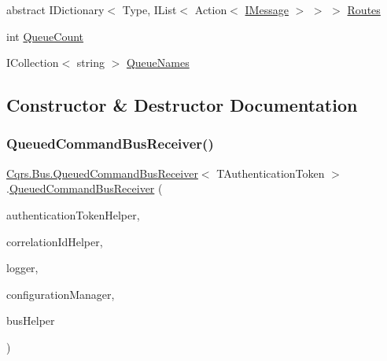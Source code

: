 \begin{DoxyCompactItemize}
\item 
abstract I\+Dictionary$<$ Type, I\+List$<$ Action$<$ \hyperlink{interfaceCqrs_1_1Messages_1_1IMessage}{I\+Message} $>$ $>$ $>$ \hyperlink{classCqrs_1_1Bus_1_1QueuedCommandBusReceiver_ad69fe38758694599261bad82e6c6378c_ad69fe38758694599261bad82e6c6378c}{Routes}
\item 
int \hyperlink{classCqrs_1_1Bus_1_1QueuedCommandBusReceiver_aefae09fd32d799ac59d35eb706f76654_aefae09fd32d799ac59d35eb706f76654}{Queue\+Count}
\item 
I\+Collection$<$ string $>$ \hyperlink{classCqrs_1_1Bus_1_1QueuedCommandBusReceiver_a959facef20063d615b427eafa4290e0f_a959facef20063d615b427eafa4290e0f}{Queue\+Names}
\end{DoxyCompactItemize}


\subsection{Constructor \& Destructor Documentation}
\mbox{\label{classCqrs_1_1Bus_1_1QueuedCommandBusReceiver_aa5158357f8e2007f06b640d4a4129781_aa5158357f8e2007f06b640d4a4129781}} 
\subsubsection{\texorpdfstring{Queued\+Command\+Bus\+Receiver()}{QueuedCommandBusReceiver()}}
{\footnotesize\ttfamily \hyperlink{classCqrs_1_1Bus_1_1QueuedCommandBusReceiver}{Cqrs.\+Bus.\+Queued\+Command\+Bus\+Receiver}$<$ T\+Authentication\+Token $>$.\hyperlink{classCqrs_1_1Bus_1_1QueuedCommandBusReceiver}{Queued\+Command\+Bus\+Receiver} (\begin{DoxyParamCaption}\item[{\hyperlink{interfaceCqrs_1_1Authentication_1_1IAuthenticationTokenHelper}{I\+Authentication\+Token\+Helper}$<$ T\+Authentication\+Token $>$}]{authentication\+Token\+Helper,  }\item[{I\+Correlation\+Id\+Helper}]{correlation\+Id\+Helper,  }\item[{I\+Logger}]{logger,  }\item[{\hyperlink{interfaceCqrs_1_1Configuration_1_1IConfigurationManager}{I\+Configuration\+Manager}}]{configuration\+Manager,  }\item[{\hyperlink{interfaceCqrs_1_1Bus_1_1IBusHelper}{I\+Bus\+Helper}}]{bus\+Helper }\end{DoxyParamCaption})\hspace{0.3cm}{\ttfamily [protected]}}



